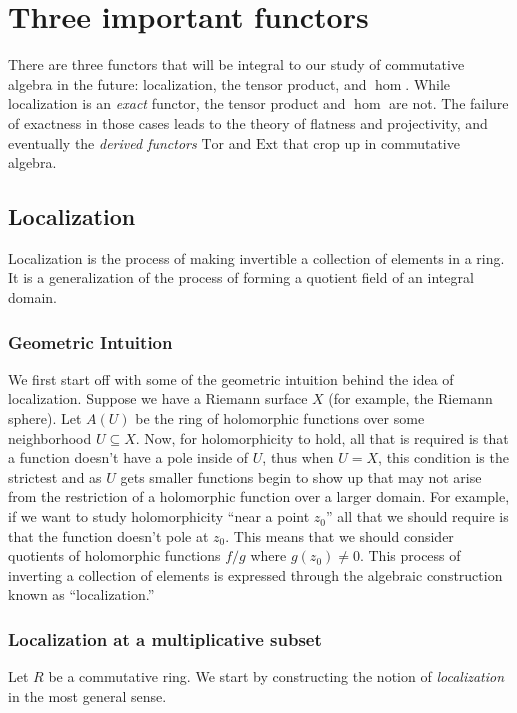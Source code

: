 
\chapter{Three important functors}

There are three functors that will be integral to our study of commutative
algebra in the future: localization, the tensor product, and $\hom$.
While localization is an \emph{exact} functor, the tensor product and $\hom$
are not. The failure of exactness in those cases leads to the theory of
flatness and projectivity, and eventually the \emph{derived functors}
$\mathrm{Tor}$ and $\mathrm{Ext}$ that crop up in commutative algebra.

\section{Localization}

Localization is the process of making invertible a collection of elements in a
ring. It is a generalization of the process of forming a quotient field of an
integral domain.

\subsection{Geometric Intuition}
We first start off with some of the geometric intuition behind the idea of
localization. Suppose we have a Riemann surface $X$ (for example, the Riemann
sphere). Let $A(U)$ be the ring of holomorphic functions over some neighborhood
$U\subseteq X$. Now, for holomorphicity to hold, all that is required is
that a function doesn't have a pole inside of $U$, thus when $U=X$, this
condition is the strictest and as $U$ gets smaller functions begin to show
up that may not arise from the restriction of a holomorphic function over
a larger domain. For example, if we want to study holomorphicity ``near a
point $z_0$'' all that we should require is that the function doesn't pole at
$z_0$. This means that we should consider quotients of holomorphic functions
$f/g$ where $g(z_0)\neq 0$. This process of inverting a collection of elements
is expressed through the algebraic construction known as ``localization.''


\subsection{Localization at a multiplicative subset}

Let $R$ be a commutative ring.
We start by constructing the notion of \emph{localization} in the most general
sense.

